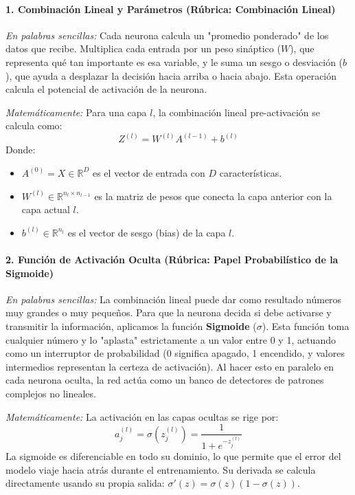 \documentclass{article}
\begin{document}
\paragraph{1. Combinación Lineal y Parámetros (Rúbrica: Combinación Lineal)}
\textit{En palabras sencillas:} Cada neurona calcula un "promedio ponderado" de los datos que recibe. Multiplica cada entrada por un peso sináptico ($W$), que representa qué tan importante es esa variable, y le suma un sesgo o desviación ($b$), que ayuda a desplazar la decisión hacia arriba o hacia abajo. Esta operación calcula el potencial de activación de la neurona.

\textit{Matemáticamente:} Para una capa $l$, la combinación lineal pre-activación se calcula como:
\begin{equation}
    Z^{(l)} = W^{(l)} A^{(l-1)} + b^{(l)}
\end{equation}
Donde:
\begin{itemize}
    \item $A^{(0)} = X \in \mathbb{R}^{D}$ es el vector de entrada con $D$ características.
    \item $W^{(l)} \in \mathbb{R}^{n_l \times n_{l-1}}$ es la matriz de pesos que conecta la capa anterior con la capa actual $l$.
    \item $b^{(l)} \in \mathbb{R}^{n_l}$ es el vector de sesgo (bias) de la capa $l$.
\end{itemize}

\paragraph{2. Función de Activación Oculta (Rúbrica: Papel Probabilístico de la Sigmoide)}
\textit{En palabras sencillas:} La combinación lineal puede dar como resultado números muy grandes o muy pequeños. Para que la neurona decida si debe activarse y transmitir la información, aplicamos la función \textbf{Sigmoide} ($\sigma$). Esta función toma cualquier número y lo "aplasta" estrictamente a un valor entre 0 y 1, actuando como un interruptor de probabilidad (0 significa apagado, 1 encendido, y valores intermedios representan la certeza de activación). Al hacer esto en paralelo en cada neurona oculta, la red actúa como un banco de detectores de patrones complejos no lineales.

\textit{Matemáticamente:} La activación en las capas ocultas se rige por:
\begin{equation}
    a_j^{(l)} = \sigma\!\left(z_j^{(l)}\right) = \frac{1}{1 + e^{-z_j^{(l)}}}
\end{equation}
La sigmoide es diferenciable en todo su dominio, lo que permite que el error del modelo viaje hacia atrás durante el entrenamiento. Su derivada se calcula directamente usando su propia salida: $\sigma'(z) = \sigma(z)(1 - \sigma(z))$.
\end{document}
